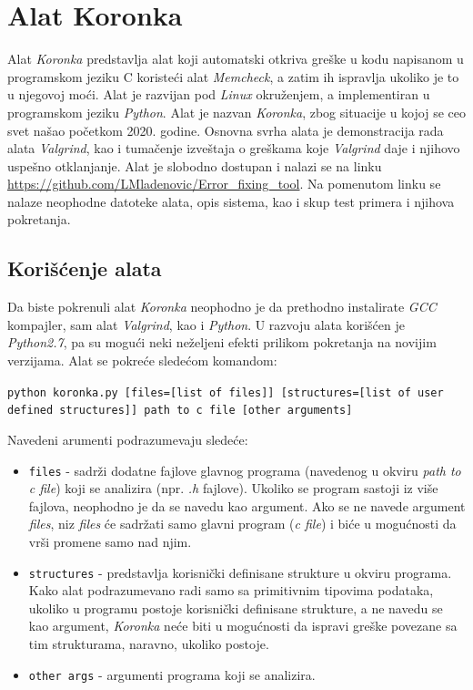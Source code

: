 \documentclass[12pt,oneside]{memoir}
\theoremstyle{plain}
\theoremstyle{definition}
\begin{document}

\chapter{Alat Koronka}
Alat \textit{Koronka} predstavlja alat koji automatski otkriva greške u kodu napisanom u programskom jeziku C koristeći alat \textit{Memcheck}, a zatim ih ispravlja ukoliko je to u njegovoj moći. Alat je razvijan pod \textit{Linux} okruženjem, a implementiran u programskom jeziku \textit{Python}. Alat je nazvan \textit{Koronka}, zbog situacije u kojoj se ceo svet našao početkom 2020. godine. Osnovna svrha alata je demonstracija rada alata \textit{Valgrind}, kao i tumačenje izveštaja o greškama koje \textit{Valgrind} daje i njihovo uspešno otklanjanje. Alat je slobodno dostupan i nalazi se na linku \url{https://github.com/LMladenovic/Error_fixing_tool}. Na pomenutom linku se nalaze neophodne datoteke alata, opis sistema, kao i skup test primera i njihova pokretanja.

\section{Korišćenje alata}
Da biste pokrenuli alat \textit{Koronka} neophodno je da prethodno instalirate \textit{GCC} kompajler, sam alat \textit{Valgrind}, kao i \textit{Python}. U razvoju alata korišćen je \textit{Python2.7}, pa su mogući neki neželjeni efekti prilikom pokretanja na novijim verzijama. Alat se pokreće sledećom komandom:
\begin{center}
\texttt{python koronka.py [files=[list of files]] [structures=[list of user defined structures]] path to c file [other arguments]}
\end{center}
Navedeni arumenti podrazumevaju sledeće:
\begin{itemize}
\item \texttt{files} - sadrži dodatne fajlove glavnog programa (navedenog u okviru \textit{path to c file}) koji se analizira (npr. \textit{.h} fajlove). Ukoliko se program sastoji iz više fajlova, neophodno je da se navedu kao argument. Ako se ne navede argument \textit{files}, niz \textit{files} će sadržati samo glavni program (\textit{c file}) i biće u mogućnosti da vrši promene samo nad njim.
\item \texttt{structures} - predstavlja korisnički definisane strukture u okviru programa. Kako alat podrazumevano radi samo sa primitivnim tipovima podataka, ukoliko u programu postoje korisnički definisane strukture, a ne navedu se kao argument, \textit{Koronka} neće biti u mogućnosti da ispravi greške povezane sa tim strukturama, naravno, ukoliko postoje.
\item \texttt{other args} - argumenti programa koji se analizira.
\end{itemize}
\end{document}
